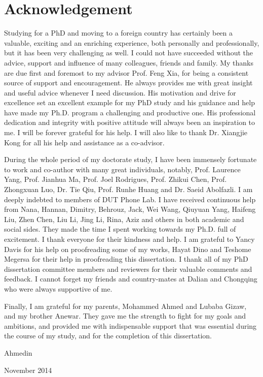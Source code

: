 \chapter*{\hfill Acknowledgement \hfill}

Studying for a PhD and moving to a foreign country has certainly been a valuable, exciting and an enriching experience, both personally and professionally, but it has been very challenging as well. I could not have succeeded without the advice, support and influence of many colleagues, friends and family. My thanks are due first and foremost to my advisor Prof. Feng Xia, for being a consistent source of support and encouragement. He always provides me with great insight and useful advice whenever I need discussion. His motivation and drive for excellence set an excellent example for my PhD study and his guidance and help have made my Ph.D. program a challenging and productive one. His professional dedication and integrity with positive attitude will always been an inspiration to me. I will be forever grateful for his help. I will also like to thank Dr. Xiangjie Kong for all his help and assistance as a co-advisor.

During the whole period of my doctorate study, I have been immensely fortunate to work and co-author with many great individuals, notably, Prof. Laurence Yang, Prof. Jianhua Ma, Prof. Joel Rodrigues, Prof. Zhikui Chen, Prof. Zhongxuan Luo, Dr. Tie Qiu, Prof. Runhe Huang and Dr. Saeid Abolfazli. I am deeply indebted to members of DUT Phone Lab. I have received continuous help from Nana, Hannan, Dimitry, Behrouz, Jack, Wei Wang, Qiuyuan Yang, Haifeng Liu, Zhen Chen, Liu Li, Jing Li, Rina, Aziz and others in both academic and social sides. They made the time I spent working towards my Ph.D. full of excitement. I thank everyone for their kindness and help. I am grateful to Yancy Davis for his help on proofreading some of my works, Hayat Dino and Teshome Megersa for their help in proofreading this dissertation. I thank all of my PhD dissertation committee members and reviewers for their valuable comments and feedback. I cannot forget my friends and country-mates at Dalian and Chongqing who were always supportive of me.

Finally, I am grateful for my parents, Mohammed Ahmed and Lubaba Gizaw, and my brother Anewar. They gave me the strength to fight for my goals and ambitions, and provided me with indispensable support that was essential during the course of my study, and for the completion of this dissertation.


\vspace{1cm}
\hfill  Ahmedin~~~~~

\hspace{1cm}
\hfill November 2014~~~
